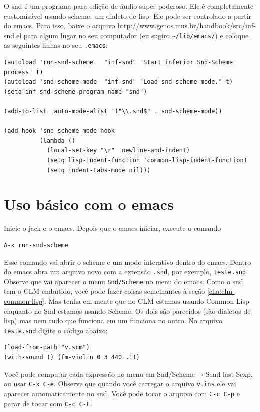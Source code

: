 \documentclass[12pt,brazil]{book}
\newcommand{\sep}{$\rightarrow$}
\begin{document}
O snd é um programa para edição de áudio super poderoso. Ele é
completamente customisável usando scheme, um dialeto de lisp. Ele pode
ser controlado a partir do emacs. Para isso, baixe o arquivo
\url{http://www.genos.mus.br/handbook/src/inf-snd.el} para algum lugar no seu
computador (eu sugiro \verb|~/lib/emacs/|) e coloque as seguintes
linhas no seu \texttt{.emacs}:

\begin{verbatim}
(autoload 'run-snd-scheme   "inf-snd" "Start inferior Snd-Scheme process" t)
(autoload 'snd-scheme-mode  "inf-snd" "Load snd-scheme-mode." t)
(setq inf-snd-scheme-program-name "snd")

(add-to-list 'auto-mode-alist '("\\.snd$" . snd-scheme-mode))

(add-hook 'snd-scheme-mode-hook
          (lambda ()
            (local-set-key "\r" 'newline-and-indent)
            (setq lisp-indent-function 'common-lisp-indent-function)
            (setq indent-tabs-mode nil)))
\end{verbatim}

\section{Uso básico com o emacs}
\label{sec:uso-basico-3}

Inicie o jack e o emacs. Depois que o emacs iniciar, execute o comando

\begin{verbatim}
A-x run-snd-scheme
\end{verbatim}

Esse comando vai abrir o scheme e um modo interativo dentro do emacs.
Dentro do emacs abra um arquivo novo com a extensão \texttt{.snd}, por
exemplo, \texttt{teste.snd}. Observe que vai aparecer o menu
\texttt{Snd/Scheme} no menu do emacs. Como o snd tem o CLM embutido,
você pode fazer coisas semelhantes à seção \ref{cha:clm-common-lisp}.
Mas tenha em mente que no CLM estamos usando Common Lisp enquanto no
Snd estamos usando Scheme. Os dois são parecidos (são dialetos de
lisp) mas nem tudo que funciona em um funciona no outro. No arquivo
\texttt{teste.snd} digite o código abaixo:

\begin{verbatim}
(load-from-path "v.scm")
(with-sound () (fm-violin 0 3 440 .1))
\end{verbatim}

Você pode computar cada expressão no menu em Snd/Scheme\sep Send last
Sexp, ou usar \texttt{C-x C-e}. Observe que quando você carregar o
arquivo \texttt{v.ins} ele vai aparecer automaticamente no snd. Você
pode tocar o arquivo com \texttt{C-c C-p} e parar de tocar com
\texttt{C-c C-t}.
\end{document}
